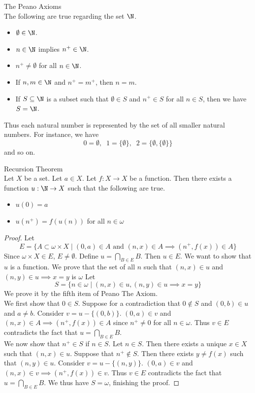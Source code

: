 \documentclass[a4paper]{article}
\begin{document}
\begin{thm}{The Peano Axioms}{}\\
The following are true regarding the set $\N$. 
\begin{itemize}
\item $\emptyset\in\N$. 
\item $n\in\N$ implies $n^+\in\N$. 
\item $n^+\neq\emptyset$ for all $n\in\N$. 
\item If $n,m\in\N$ and $n^+=m^+$, then $n=m$. 
\item If $S\subseteq\N$ is a subset such that $\emptyset\in S$ and $n^+\in S$ for all $n\in S$, then we have $S=\N$. 
\end{itemize}
\end{thm}

Thus each natural number is represented by the set of all smaller natural numbers. For instance, we have $$0=\emptyset,\;\;1=\{\emptyset\},\;\;2=\{\emptyset,\{\emptyset\}\}$$ and so on. 


\begin{thm}{Recursion Theorem}{}\\
Let $X$ be a set. Let $a\in X$. Let $f:X\to X$ be a function. Then there exists a function $u:\N\to X$ such that the following are true. 
\begin{itemize}
\item $u(0)=a$
\item $u(n^+)=f(u(n))$ for all $n\in\omega$
\end{itemize}
\begin{proof} Let $$E=\{A\subset\omega\times X\;|\;(0,a)\in A\text{ and }(n,x)\in A\implies (n^+,f(x))\in A\}$$ Since $\omega\times X\in E$, $E\neq\emptyset$. Define $u=\bigcap_{B\in E}B$. Then $u\in E$. We want to show that $u$ is a function. We prove that the set of all $n$ such that $(n,x)\in u$ and $(n,y)\in u\implies x=y$ is $\omega$ Let $$S=\{n\in\omega\;|\;(n,x)\in u,(n,y)\in u\implies x=y\}$$ We prove it by the fifth item of Peano The Axiom. \\
We first show that $0\in S$. Suppose for a contradiction that $0\notin S$ and $(0,b)\in u$ and $a\neq b$. Consider $v=u-\{(0,b)\}$. $(0,a)\in v$ and $(n,x)\in A\implies (n^+,f(x))\in A$ since $n^+\neq 0$ for all $n\in\omega$. Thus $v\in E$ contradicts the fact that $u=\bigcap_{B\in E}B$. \\
We now show that $n^+\in S$ if $n\in S$. Let $n\in S$. Then there exists a unique $x\in X$ such that $(n,x)\in u$. Suppose that $n^+\notin S$. Then there exists $y\neq f(x)$ such that $(n,y)\in u$. Consider $v=u-\{(n,y)\}$. $(0,a)\in v$ and $(n,x)\in v\implies (n^+,f(x))\in v$. Thus $v\in E$ contradicts the fact that $u=\bigcap_{B\in E}B$. We thus have $S=\omega$, finishing the proof. 
\end{proof}
\end{thm}
\end{document}
